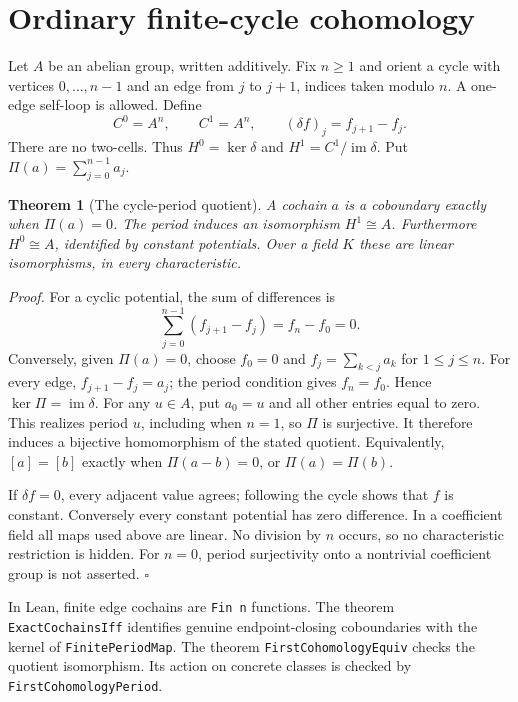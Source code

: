 \documentclass[11pt,letterpaper]{article}
\newtheorem{theorem}{Theorem}
\newenvironment{proof}{\noindent\textit{Proof.}}{\hfill\(\square\)}
\begin{document}
\section{Ordinary finite-cycle cohomology}

Let \(A\) be an abelian group, written additively. Fix \(n\ge1\) and orient a cycle with vertices \(0,\ldots,n-1\) and an edge from \(j\) to \(j+1\), indices taken modulo \(n\). A one-edge self-loop is allowed. Define
\[
C^0=A^n,\qquad C^1=A^n,\qquad
(\delta f)_j=f_{j+1}-f_j.
\]
There are no two-cells. Thus \(H^0=\ker\delta\) and \(H^1=C^1/\operatorname{im}\delta\). Put \(\Pi(a)=\sum_{j=0}^{n-1}a_j\).

\begin{theorem}[The cycle-period quotient]
A cochain \(a\) is a coboundary exactly when \(\Pi(a)=0\). The period induces an isomorphism \(H^1\cong A\). Furthermore \(H^0\cong A\), identified by constant potentials. Over a field \(K\) these are linear isomorphisms, in every characteristic.
\end{theorem}
\begin{proof}
For a cyclic potential, the sum of differences is
\[
\sum_{j=0}^{n-1}(f_{j+1}-f_j)=f_n-f_0=0.
\]
Conversely, given \(\Pi(a)=0\), choose \(f_0=0\) and \(f_j=\sum_{k<j}a_k\) for \(1\le j\le n\). For every edge, \(f_{j+1}-f_j=a_j\); the period condition gives \(f_n=f_0\). Hence \(\ker\Pi=\operatorname{im}\delta\). For any \(u\in A\), put \(a_0=u\) and all other entries equal to zero. This realizes period \(u\), including when \(n=1\), so \(\Pi\) is surjective. It therefore induces a bijective homomorphism of the stated quotient. Equivalently, \([a]=[b]\) exactly when \(\Pi(a-b)=0\), or \(\Pi(a)=\Pi(b)\).

If \(\delta f=0\), every adjacent value agrees; following the cycle shows that \(f\) is constant. Conversely every constant potential has zero difference. In a coefficient field all maps used above are linear. No division by \(n\) occurs, so no characteristic restriction is hidden. For \(n=0\), period surjectivity onto a nontrivial coefficient group is not asserted.
\end{proof}

In Lean, finite edge cochains are \texttt{Fin n} functions. The theorem \texttt{Exact\allowbreak Cochains\allowbreak Iff} identifies genuine endpoint-closing coboundaries with the kernel of \texttt{Finite\allowbreak Period\allowbreak Map}. The theorem \texttt{First\allowbreak Cohomology\allowbreak Equiv} checks the quotient isomorphism. Its action on concrete classes is checked by \texttt{First\allowbreak Cohomology\allowbreak Period}.
\end{document}
